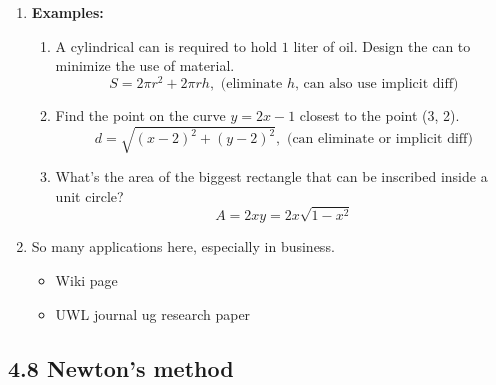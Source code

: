 \documentclass{article}
\begin{document}
\begin{enumerate}
\item {\bf Examples:}
\begin{enumerate}
\item A cylindrical can is required to hold $1$ liter of oil. Design the can to minimize the use of material. 
\[
S = 2\pi r^2 + 2\pi r h, \text{ (eliminate $h$, can also use implicit diff)}
\]
\item Find the point on the curve $ y = 2x-1$ closest to the point (3, 2). 
\[
d = \sqrt{(x-2)^2+(y-2)^2}, \text{ (can eliminate or implicit diff)}
\]
\item What's the area of the biggest rectangle that can be inscribed inside a unit circle?
\[
A = 2xy = 2x\sqrt{1-x^2}
\]
\end{enumerate}
\item So many applications here, especially in business.
\begin{itemize}
\item Wiki page
\item UWL journal ug research paper
\end{itemize}
\end{enumerate}


\subsection{4.8 Newton's method}
\end{document}

